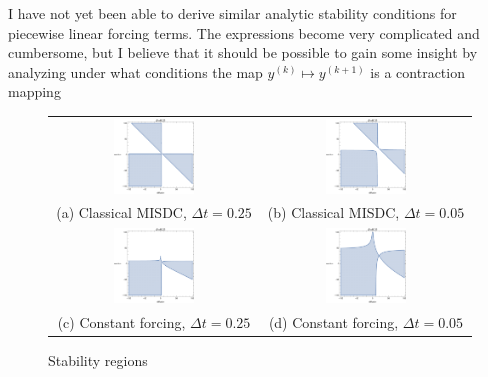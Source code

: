 \documentclass[12pt]{article}
\begin{document}
I have not yet been able to derive similar analytic stability conditions for 
piecewise linear forcing terms. The expressions become very complicated 
and cumbersome, but I believe that it should be possible to gain some insight 
by analyzing under what conditions the map $y^{(k)} \mapsto y^{(k+1)}$ is a 
contraction mapping
\begin{figure}[H]
\begin{tabular}{cc}
  \includegraphics[width=0.4\textwidth]{misdc1} &   \includegraphics[width=0.4\textwidth]{misdc2} \\
(a) Classical MISDC, $\Delta t = 0.25$ & (b) Classical MISDC, $\Delta t = 0.05$ \\[6pt]
 \includegraphics[width=0.4\textwidth]{const1} &   \includegraphics[width=0.4\textwidth]{const2} \\
(c) Constant forcing, $\Delta t = 0.25$ & (d) Constant forcing, $\Delta t = 0.05$\\[6pt]
\end{tabular}
\caption{Stability regions}
\end{figure}
\end{document}
